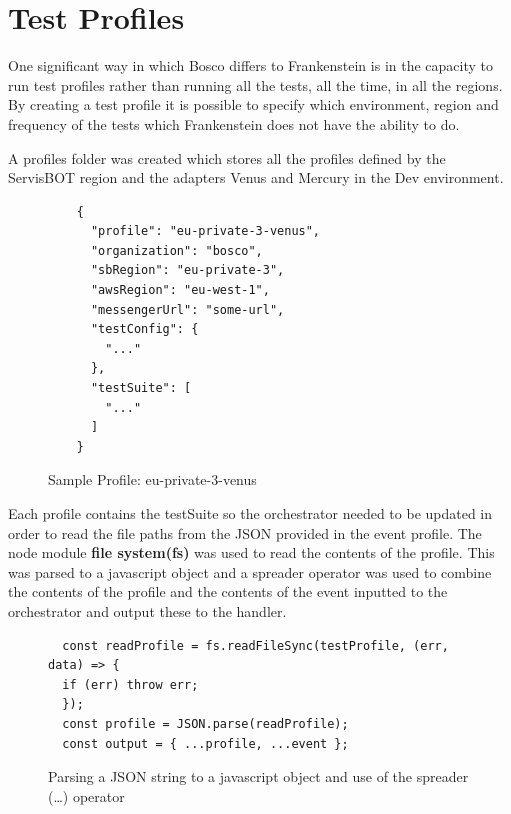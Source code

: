 \documentclass[12pt,a4paper,titlepage]{report}
\begin{document}
\section{Test Profiles}
One significant way in which Bosco differs to Frankenstein is in the capacity to run test profiles rather than 
running all the tests, all the time, in all the regions. By creating a test profile it is possible to specify which 
environment, region and frequency of the tests which Frankenstein does not have the ability to do. 

A profiles folder was created which stores all the profiles defined by the ServisBOT region and the adapters Venus and Mercury in the Dev environment. 

\begin{figure}[H]
  \begin{tcolorbox}
   \begin{verbatim}
    {
      "profile": "eu-private-3-venus",
      "organization": "bosco",
      "sbRegion": "eu-private-3",
      "awsRegion": "eu-west-1",
      "messengerUrl": "some-url",
      "testConfig": {
        "..."
      },
      "testSuite": [
        "..."
      ]
    }
   \end{verbatim}
  \end{tcolorbox}
  \caption{Sample Profile: eu-private-3-venus}
 \end{figure}

Each profile contains the testSuite so the orchestrator needed to be updated in order to read the file paths from the JSON provided in the 
event profile. The node module \textbf{file system(fs)} was used to read the contents of the profile. This was parsed to 
a javascript object and a spreader operator was used to combine the contents of the profile and the contents of 
the event inputted to the orchestrator and output these to the handler.

\begin{figure}[H]
 \begin{tcolorbox}
  \begin{verbatim}
  const readProfile = fs.readFileSync(testProfile, (err, data) => {
  if (err) throw err;
  });
  const profile = JSON.parse(readProfile);
  const output = { ...profile, ...event };
  \end{verbatim}
 \end{tcolorbox}
 \caption{Parsing a JSON string to a javascript object and use of the spreader (\dots) operator}
\end{figure}
\end{document}
